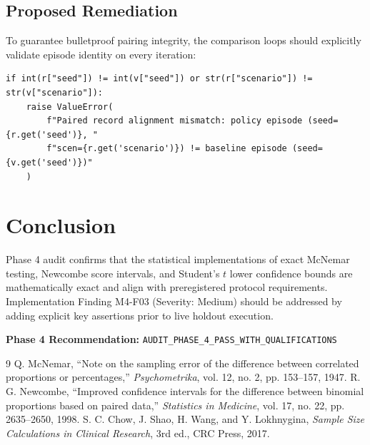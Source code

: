 \documentclass[10pt,a4paper]{article}
\begin{document}
\subsection{Proposed Remediation}
To guarantee bulletproof pairing integrity, the comparison loops should explicitly validate episode identity on every iteration:
\begin{verbatim}
if int(r["seed"]) != int(v["seed"]) or str(r["scenario"]) != str(v["scenario"]):
    raise ValueError(
        f"Paired record alignment mismatch: policy episode (seed={r.get('seed')}, "
        f"scen={r.get('scenario')}) != baseline episode (seed={v.get('seed')})"
    )
\end{verbatim}

\section{Conclusion}
Phase 4 audit confirms that the statistical implementations of exact McNemar testing, Newcombe score intervals, and Student's $t$ lower confidence bounds are mathematically exact and align with preregistered protocol requirements. Implementation Finding M4-F03 (Severity: Medium) should be addressed by adding explicit key assertions prior to live holdout execution.

\noindent \textbf{Phase 4 Recommendation:} \texttt{AUDIT\_PHASE\_4\_PASS\_WITH\_QUALIFICATIONS}

\begin{thebibliography}{9}
 Q. McNemar, ``Note on the sampling error of the difference between correlated proportions or percentages,'' \textit{Psychometrika}, vol. 12, no. 2, pp. 153--157, 1947.
 R. G. Newcombe, ``Improved confidence intervals for the difference between binomial proportions based on paired data,'' \textit{Statistics in Medicine}, vol. 17, no. 22, pp. 2635--2650, 1998.
 S. C. Chow, J. Shao, H. Wang, and Y. Lokhnygina, \textit{Sample Size Calculations in Clinical Research}, 3rd ed., CRC Press, 2017.
\end{thebibliography}
\end{document}
